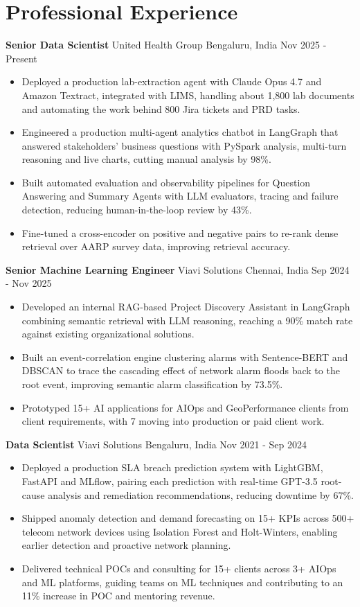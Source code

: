 \documentclass[10pt,a4paper]{article}
\newcommand{\role}[4]{\textbf{#1} \textbar{} #2 \hfill #3 \textbar{} #4\par}
\begin{document}
\section{Professional Experience}
\role{Senior Data Scientist}{United Health Group}{Bengaluru, India}{Nov 2025 - Present}
\begin{itemize}
  \item Deployed a production lab-extraction agent with Claude Opus 4.7 and Amazon Textract, integrated with LIMS, handling about 1,800 lab documents and automating the work behind 800 Jira tickets and PRD tasks.
  \item Engineered a production multi-agent analytics chatbot in LangGraph that answered stakeholders' business questions with PySpark analysis, multi-turn reasoning and live charts, cutting manual analysis by 98\%.
  \item Built automated evaluation and observability pipelines for Question Answering and Summary Agents with LLM evaluators, tracing and failure detection, reducing human-in-the-loop review by 43\%.
  \item Fine-tuned a cross-encoder on positive and negative pairs to re-rank dense retrieval over AARP survey data, improving retrieval accuracy.
\end{itemize}
\vspace{3pt}
\role{Senior Machine Learning Engineer}{Viavi Solutions}{Chennai, India}{Sep 2024 - Nov 2025}
\begin{itemize}
  \item Developed an internal RAG-based Project Discovery Assistant in LangGraph combining semantic retrieval with LLM reasoning, reaching a 90\% match rate against existing organizational solutions.
  \item Built an event-correlation engine clustering alarms with Sentence-BERT and DBSCAN to trace the cascading effect of network alarm floods back to the root event, improving semantic alarm classification by 73.5\%.
  \item Prototyped 15+ AI applications for AIOps and GeoPerformance clients from client requirements, with 7 moving into production or paid client work.
\end{itemize}
\vspace{3pt}
\role{Data Scientist}{Viavi Solutions}{Bengaluru, India}{Nov 2021 - Sep 2024}
\begin{itemize}
  \item Deployed a production SLA breach prediction system with LightGBM, FastAPI and MLflow, pairing each prediction with real-time GPT-3.5 root-cause analysis and remediation recommendations, reducing downtime by 67\%.
  \item Shipped anomaly detection and demand forecasting on 15+ KPIs across 500+ telecom network devices using Isolation Forest and Holt-Winters, enabling earlier detection and proactive network planning.
  \item Delivered technical POCs and consulting for 15+ clients across 3+ AIOps and ML platforms, guiding teams on ML techniques and contributing to an 11\% increase in POC and mentoring revenue.
\end{itemize}
\end{document}
